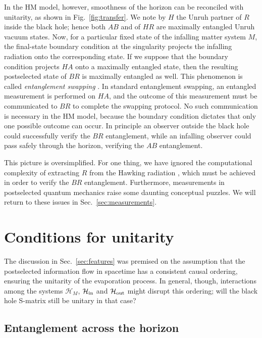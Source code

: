 \documentclass[11pt]{article}
\begin{document}
In the HM model, however, smoothness of the horizon can be reconciled with unitarity, as shown in Fig.~\ref{fig:transfer}. We note by $H$ the Unruh partner of $R$ inside the black hole; hence both $AB$ and of $HR$ are maximally entangled Unruh vacuum states. Now, for a particular fixed state of the infalling matter system $M$, the final-state boundary condition at the singularity projects the infalling radiation onto the corresponding state. If we suppose that the boundary condition projects $HA$ onto a maximally entangled state, then the resulting postselected state of $BR$ is maximally entangled as well. This phenomenon is called {\em entanglement swapping} \cite{swapping1,swapping2}. In standard entanglement swapping, an entangled measurement is performed on $HA$, and the outcome of this measurement must be communicated to $BR$ to complete the swapping protocol. No such communication is necessary in the HM model, because the boundary condition dictates that only one possible outcome can occur. In principle an observer outside the black hole could successfully verify the $BR$ entanglement, while an infalling observer could pass safely through the horizon, verifying the $AB$ entanglement.

This picture is oversimplified. For one thing, we have ignored the computational complexity of extracting $R$ from the Hawking radiation \cite{harlow-hayden}, which must be achieved in order to verify the $BR$ entanglement. Furthermore, measurements in postselected quantum mechanics raise some daunting conceptual puzzles. We will return to these issues in Sec.~\ref{sec:measurements}.

\section{Conditions for unitarity}
\label{sec:conditions}

The discussion in Sec.~\ref{sec:features} was premised on the assumption that the postselected information flow in spacetime has a consistent causal ordering, ensuring the unitarity of the evaporation process. In general, though, interactions among the systems $\mathcal{H}_M$, $\mathcal{H}_{\rm in}$ and $\mathcal{H}_{\rm out}$ might disrupt this ordering; will the black hole S-matrix still be unitary in that case?

\subsection{Entanglement across the horizon}
\end{document}
